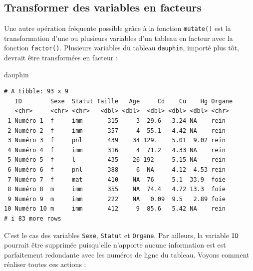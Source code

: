 \documentclass[
  a4paper,
  DIV=11,
  numbers=noendperiod,
  oneside]{scrreprt}
\newenvironment{Shaded}{}{}
\newcommand{\NormalTok}[1]{\textcolor[rgb]{0.14,0.16,0.18}{#1}}
\begin{document}
\subsection{Transformer des variables en
facteurs}\label{transformer-des-variables-en-facteurs}

Une autre opération fréquente possible grâce à la fonction
\texttt{mutate()} est la transformation d'une ou plusieurs variables
d'un tableau en facteur avec la fonction \texttt{factor()}. Plusieurs
variables du tableau \texttt{dauphin}, importé plus tôt, devrait être
transformées en facteur :

\begin{Shaded}
\begin{Highlighting}[]
\NormalTok{dauphin}
\end{Highlighting}
\end{Shaded}

\begin{verbatim}
# A tibble: 93 x 9
   ID        Sexe  Statut Taille   Age     Cd    Cu    Hg Organe
   <chr>     <chr> <chr>   <dbl> <dbl>  <dbl> <dbl> <dbl> <chr> 
 1 Numéro 1  f     imm       315     3  29.6   3.24 NA    rein  
 2 Numéro 2  f     imm       357     4  55.1   4.42 NA    rein  
 3 Numéro 3  f     pnl       439    34 129.    5.01  9.02 rein  
 4 Numéro 4  f     imm       316     4  71.2   4.33 NA    rein  
 5 Numéro 5  f     l         435    26 192     5.15 NA    rein  
 6 Numéro 6  f     pnl       388     6  NA     4.12  4.53 rein  
 7 Numéro 7  f     mat       410    NA  76     5.1  33.9  foie  
 8 Numéro 8  m     imm       355    NA  74.4   4.72 13.3  foie  
 9 Numéro 9  m     imm       222    NA   0.09  9.5   2.89 foie  
10 Numéro 10 m     imm       412     9  85.6   5.42 NA    rein  
# i 83 more rows
\end{verbatim}

C'est le cas des variables \texttt{Sexe}, \texttt{Statut} et
\texttt{Organe}. Par ailleurs, la variable \texttt{ID} pourrait être
supprimée puisqu'elle n'apporte aucune information est est parfaitement
redondante avec les numéros de ligne du tableau. Voyons comment réaliser
toutes ces actions :
\end{document}
